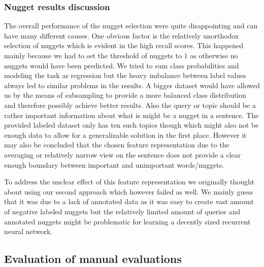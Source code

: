 \documentclass{article}
\begin{document}
\subsubsection{Nugget results discussion}
The overall performance of the nugget selection were quite disappointing and can have many different causes. One obvious factor is the relatively unorthodox selection of nuggets which is evident in the high recall scores. This happened mainly because we had to set the threshold of nuggets to $1$ as otherwise no nuggets would have been predicted. We tried to sum class probabilities and modeling the task as regression but the heavy imbalance between label values always led to similar problems in the results. A bigger dataset would have allowed us by the means of subsampling to provide a more balanced class distribution and therefore possibly achieve better results. Also the query or topic should be a rather important information about what is might be a nugget in a sentence. The provided labeled dataset only has ten such topics though which might also not be enough data to allow for a generalizable solution in the first place.  However it may also be concluded that the chosen feature representation due to the averaging or relatively narrow view on the sentence does not provide a clear enough boundary between important and unimportant words/nuggets.

To address the unclear effect of this feature representation we originally thought about using our second approach which however failed as well. We mainly guess that it was due to a lack of annotated data as  it was easy to create vast amount of negative labeled nuggets but the relatively limited amount of queries and annotated nuggets might be problematic for learning a decently sized recurrent neural network.
\subsection{Evaluation of manual evaluations}
\label{subsec:maneval}



\small



\end{document}
